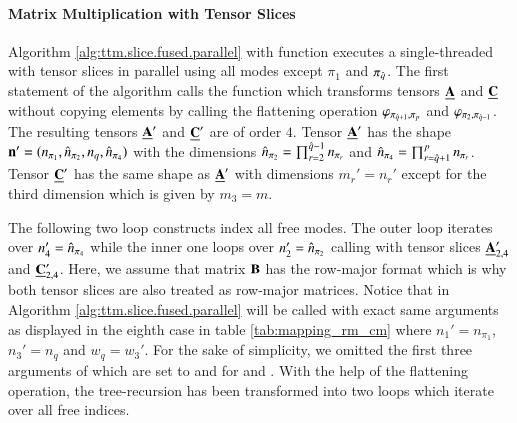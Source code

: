 \paragraph{Matrix Multiplication with Tensor Slices}
Algorithm \ref{alg:ttm.slice.fused.parallel} with function \allowbreak{} executes a single-threaded  with tensor slices in parallel using all modes except $\pi_1$ and $\pi_{\hat{q}}$.
The first statement of the algorithm calls the  function which transforms tensors $\underline{\mathbf{A}}$ and $\underline{\mathbf{C}}$ without copying elements by calling the flattening operation $\varphi_{\pi_{\hat{q}+1},\pi_p}$ and $\varphi_{\pi_{2},\pi_{\hat{q}-1}}$.
The resulting tensors $\underline{\mathbf{A}}'$ and $\underline{\mathbf{C}}'$ are of order $4$.
Tensor $\underline{\mathbf{A}}'$ has the shape $\mathbf{n}'=(n_{\pi_1},\hat{n}_{\pi_2},n_{q}, \hat{n}_{\pi_4})$ with the dimensions $\hat{n}_{\pi_2} = \prod_{r=2}^{\hat{q}-1} n_{\pi_r}$ and $\hat{n}_{\pi_4} = \prod_{r=\hat{q}+1}^{p} n_{\pi_r}$.
Tensor $\underline{\mathbf{C}}'$ has the same shape as $\underline{\mathbf{A}}'$ with dimensions $m_r' = n_r'$ except for the third dimension which is given by $m_3=m$.

The following two  loop constructs index all free modes.
The outer loop iterates over $n_4' = \hat{n}_{\pi_4}$ while the inner one loops over $n_2' = \hat{n}_{\pi_2}$ calling  with tensor slices $\underline{\mathbf{A}}_{2,4}'$ and $\underline{\mathbf{C}}_{2,4}'$.
Here, we assume that matrix $\mathbf{B}$ has the row-major format which is why both tensor slices are also treated as row-major matrices.
Notice that  in Algorithm \ref{alg:ttm.slice.fused.parallel} will be called with exact same arguments as displayed in the eighth case in table \ref{tab:mapping_rm_cm} where $n_{1}' = n_{\pi_1}$, $n_{3}' = n_q$ and $w_q = w_3'$. %
For the sake of simplicity, we omitted the first three arguments of  which are set to  and  for  and .
With the help of the flattening operation, the tree-recursion has been transformed into two loops which iterate over all free indices.




